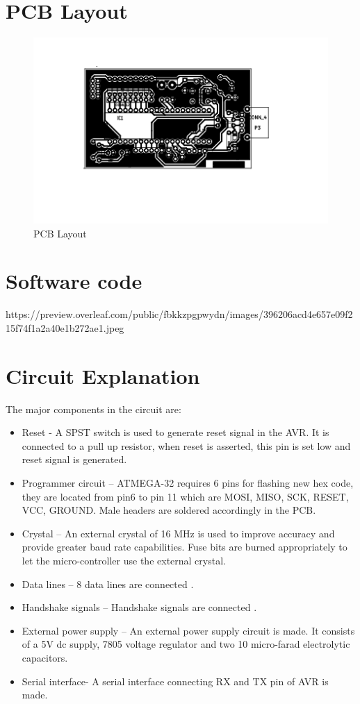 \documentclass[12pt]{article}
\begin{document}
\section{PCB Layout}
\begin{figure}[!h]
\includegraphics[width=5.5in]{pcblayout}
\centering
\caption{PCB Layout}
\end{figure}
\newpage

\section{Software code}https://preview.overleaf.com/public/fbkkzpgpwydn/images/396206acd4e657e09f215f74f1a2a40e1b272ae1.jpeg


\newpage
\section{Circuit Explanation}
The major components in the circuit are:
\begin{itemize}


\item 	Reset - A SPST switch is used to generate reset signal in the AVR. It is connected to a pull up resistor, when reset is asserted, this pin is set low and reset signal is generated.
\item	Programmer circuit – ATMEGA-32 requires 6 pins for flashing new hex code, they are located from pin6 to pin 11 which are MOSI, MISO, SCK, RESET, VCC, GROUND. Male headers are soldered accordingly in the PCB.
\item	Crystal – An external crystal of 16 MHz is used to improve accuracy and provide greater baud rate capabilities. Fuse bits are burned appropriately to let the micro-controller use the external crystal.
\item	Data lines – 8 data lines are connected .
\item	Handshake signals – Handshake signals are connected . 
\item	External power supply – An external power supply circuit is made. It consists of a 5V dc supply, 7805 voltage regulator and two 10 micro-farad electrolytic capacitors.
\item	Serial interface- A serial interface connecting RX and TX pin of AVR is made. 
\end{itemize}
\newpage
\end{document}
